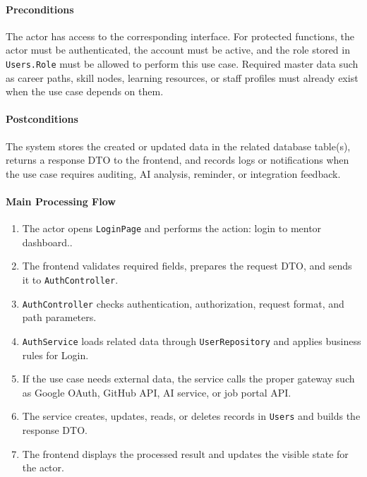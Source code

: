 \paragraph{Preconditions}

The actor has access to the corresponding interface. For protected functions, the actor must be authenticated, the account must be active, and the role stored in \texttt{Users.Role} must be allowed to perform this use case. Required master data such as career paths, skill nodes, learning resources, or staff profiles must already exist when the use case depends on them.

\paragraph{Postconditions}

The system stores the created or updated data in the related database table(s), returns a response DTO to the frontend, and records logs or notifications when the use case requires auditing, AI analysis, reminder, or integration feedback.

\paragraph{Main Processing Flow}

\begin{enumerate}
    \item The actor opens \texttt{LoginPage} and performs the action: login to mentor dashboard..
    \item The frontend validates required fields, prepares the request DTO, and sends it to \texttt{AuthController}.
    \item \texttt{AuthController} checks authentication, authorization, request format, and path parameters.
    \item \texttt{AuthService} loads related data through \texttt{UserRepository} and applies business rules for Login.
    \item If the use case needs external data, the service calls the proper gateway such as Google OAuth, GitHub API, AI service, or job portal API.
    \item The service creates, updates, reads, or deletes records in \texttt{Users} and builds the response DTO.
    \item The frontend displays the processed result and updates the visible state for the actor.
\end{enumerate}

